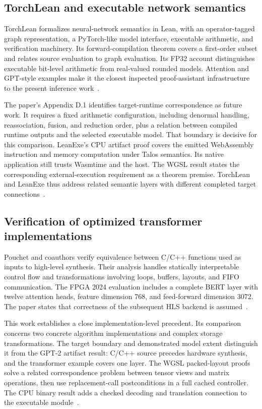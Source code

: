 \subsection{TorchLean and executable network semantics}

TorchLean formalizes neural-network semantics in Lean, with an operator-tagged graph representation, a PyTorch-like model interface, executable arithmetic, and verification machinery.  Its forward-compilation theorem covers a first-order subset and relates source evaluation to graph evaluation.  Its FP32 account distinguishes executable bit-level arithmetic from real-valued rounded models.  Attention and GPT-style examples make it the closest inspected proof-assistant infrastructure to the present inference work~\cite{lit-torchlean}.

The paper's Appendix D.1 identifies target-runtime correspondence as future work.  It requires a fixed arithmetic configuration, including denormal handling, reassociation, fusion, and reduction order, plus a relation between compiled runtime outputs and the selected executable model.  That boundary is decisive for this comparison.  LeanExe's CPU artifact proof covers the emitted WebAssembly instruction and memory computation under Talos semantics.  Its native application still trusts Wasmtime and the host.  The WGSL result states the corresponding external-execution requirement as a theorem premise.  TorchLean and LeanExe thus address related semantic layers with different completed target connections~\cite{lit-torchlean}.

\subsection{Verification of optimized transformer implementations}

Pouchet and coauthors verify equivalence between C/C++ functions used as inputs to high-level synthesis.  Their analysis handles statically interpretable control flow and transformations involving loops, buffers, layouts, and FIFO communication.  The FPGA 2024 evaluation includes a complete BERT layer with twelve attention heads, feature dimension 768, and feed-forward dimension 3072.  The paper states that correctness of the subsequent HLS backend is assumed~\cite{lit-hls}.

This work establishes a close implementation-level precedent.  Its comparison concerns two concrete algorithm implementations and complex storage transformations.  The target boundary and demonstrated model extent distinguish it from the GPT-2 artifact result: C/C++ source precedes hardware synthesis, and the transformer example covers one layer.  The WGSL packed-layout proofs solve a related correspondence problem between tensor views and matrix operations, then use replacement-call postconditions in a full cached controller.  The CPU binary result adds a checked decoding and translation connection to the executable module~\cite{lit-hls}.

